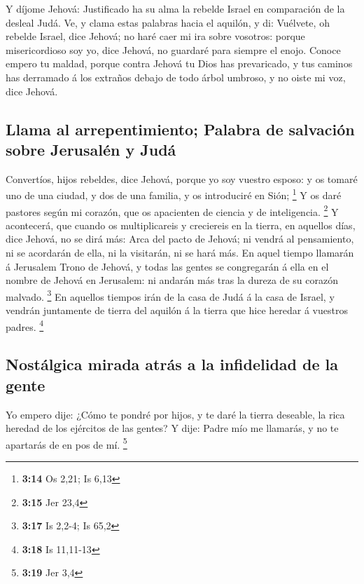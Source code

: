  Y díjome Jehová: Justificado ha su alma la rebelde
Israel en comparación de la desleal Judá.  Ve, y clama
estas palabras hacia el aquilón, y di: Vuélvete, oh rebelde Israel, dice
Jehová; no haré caer mi ira sobre vosotros: porque misericordioso soy
yo, dice Jehová, no guardaré para siempre el enojo. 
Conoce empero tu maldad, porque contra Jehová tu Dios has prevaricado, y
tus caminos has derramado á los extraños debajo de todo árbol umbroso, y
no oiste mi voz, dice Jehová.

\hypertarget{llama-al-arrepentimiento-palabra-de-salvaciuxf3n-sobre-jerusaluxe9n-y-juduxe1}{%
\subsection{Llama al arrepentimiento; Palabra de salvación sobre
Jerusalén y
Judá}\label{llama-al-arrepentimiento-palabra-de-salvaciuxf3n-sobre-jerusaluxe9n-y-juduxe1}}

 Convertíos, hijos rebeldes, dice Jehová, porque yo soy
vuestro esposo: y os tomaré uno de una ciudad, y dos de una familia, y
os introduciré en Sión; \footnote{\textbf{3:14} Os 2,21; Is 6,13}
 Y os daré pastores según mi corazón, que os apacienten
de ciencia y de inteligencia. \footnote{\textbf{3:15} Jer 23,4}
 Y acontecerá, que cuando os multiplicareis y creciereis
en la tierra, en aquellos días, dice Jehová, no se dirá más: Arca del
pacto de Jehová; ni vendrá al pensamiento, ni se acordarán de ella, ni
la visitarán, ni se hará más.  En aquel tiempo llamarán á
Jerusalem Trono de Jehová, y todas las gentes se congregarán á ella en
el nombre de Jehová en Jerusalem: ni andarán más tras la dureza de su
corazón malvado. \footnote{\textbf{3:17} Is 2,2-4; Is 65,2}
 En aquellos tiempos irán de la casa de Judá á la casa de
Israel, y vendrán juntamente de tierra del aquilón á la tierra que hice
heredar á vuestros padres. \footnote{\textbf{3:18} Is 11,11-13}

\hypertarget{nostuxe1lgica-mirada-atruxe1s-a-la-infidelidad-de-la-gente}{%
\subsection{Nostálgica mirada atrás a la infidelidad de la
gente}\label{nostuxe1lgica-mirada-atruxe1s-a-la-infidelidad-de-la-gente}}

 Yo empero dije: ¿Cómo te pondré por hijos, y te daré la
tierra deseable, la rica heredad de los ejércitos de las gentes? Y dije:
Padre mío me llamarás, y no te apartarás de en pos de mí. \footnote{\textbf{3:19}
  Jer 3,4}

